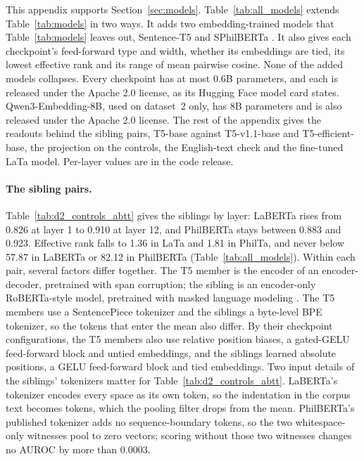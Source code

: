 \documentclass[11pt]{article}
\begin{document}
This appendix supports Section~\ref{sec:models}.
Table~\ref{tab:all_models} extends Table~\ref{tab:models} in two ways.
It adds two embedding-trained models that Table~\ref{tab:models} leaves out, Sentence-T5 \citep{ni2022sentencet5} and SPhilBERTa \citep{riemenschneider2023sphilberta}.
It also gives each checkpoint's feed-forward type and width, whether its embeddings are tied, its lowest effective rank and its range of mean pairwise cosine.
None of the added models collapses.
Every checkpoint has at most 0.6B parameters, and each is released under the Apache 2.0 license, as its Hugging Face model card states.
Qwen3-Embedding-8B, used on dataset~2 only, has 8B parameters and is also released under the Apache 2.0 license.
The rest of the appendix gives the readouts behind the sibling pairs, T5-base against T5-v1.1-base and T5-efficient-base, the projection on the controls, the English-text check and the fine-tuned LaTa model.
Per-layer values are in the code release.



\paragraph{The sibling pairs.}
Table~\ref{tab:d2_controls_abtt} gives the siblings by layer: LaBERTa rises from 0.826 at layer 1 to 0.910 at layer 12, and PhilBERTa stays between 0.883 and 0.923.
Effective rank falls to 1.36 in LaTa and 1.81 in PhilTa, and never below 57.87 in LaBERTa or 82.12 in PhilBERTa (Table~\ref{tab:all_models}).
Within each pair, several factors differ together.
The T5 member is the encoder of an encoder-decoder, pretrained with span corruption; the sibling is an encoder-only RoBERTa-style model, pretrained with masked language modeling \citep{riemenschneider2023lata}.
The T5 members use a SentencePiece tokenizer and the siblings a byte-level BPE tokenizer, so the tokens that enter the mean also differ.
By their checkpoint configurations, the T5 members also use relative position biases, a gated-GELU feed-forward block and untied embeddings, and the siblings learned absolute positions, a GELU feed-forward block and tied embeddings.
Two input details of the siblings' tokenizers matter for Table~\ref{tab:d2_controls_abtt}.
LaBERTa's tokenizer encodes every space as its own token, so the indentation in the corpus text becomes tokens, which the pooling filter drops from the mean.
PhilBERTa's published tokenizer adds no sequence-boundary tokens, so the two whitespace-only witnesses pool to zero vectors; scoring without those two witnesses changes no AUROC by more than 0.0003.
\end{document}
